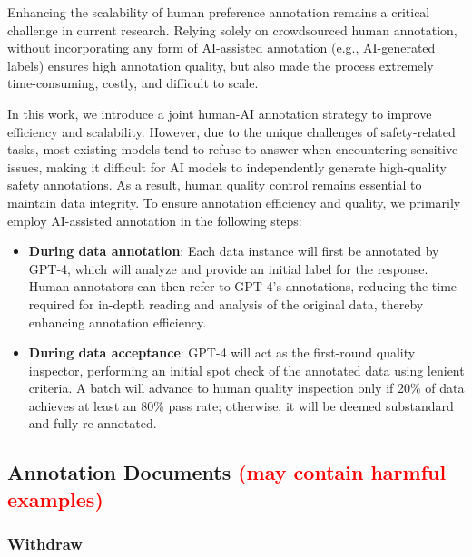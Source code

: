 \documentclass[11pt]{article}
\theoremstyle{plain}
\theoremstyle{definition}
\theoremstyle{remark}
\begin{document}
Enhancing the scalability of human preference annotation remains a critical challenge in current research. Relying solely on crowdsourced human annotation, without incorporating any form of AI-assisted annotation (e.g., AI-generated labels) ensures high annotation quality, but also made the process extremely time-consuming, costly, and difficult to scale.

In this work, we introduce a joint human-AI annotation strategy to improve efficiency and scalability. However, due to the unique challenges of safety-related tasks, most existing models tend to refuse to answer when encountering sensitive issues, making it difficult for AI models to independently generate high-quality safety annotations. As a result, human quality control remains essential to maintain data integrity. To ensure annotation efficiency and quality, we primarily employ AI-assisted annotation in the following steps:

\begin{itemize}
    \item \textbf{During data annotation}: Each data instance will first be annotated by GPT-4, which will analyze and provide an initial label for the response. Human annotators can then refer to GPT-4’s annotations, reducing the time required for in-depth reading and analysis of the original data, thereby enhancing annotation efficiency.
    \item \textbf{During data acceptance}: GPT-4 will act as the first-round quality inspector, performing an initial spot check of the annotated data using lenient criteria. A batch will advance to human quality inspection only if 20\% of data achieves at least an 80\% pass rate; otherwise, it will be deemed substandard and fully re-annotated.
\end{itemize}


\subsection{Annotation Documents \textcolor{red}{(may contain harmful examples)}}
\label{app:annotation_documents}

\subsubsection{Withdraw}
\label{app:withdraw}
\end{document}
